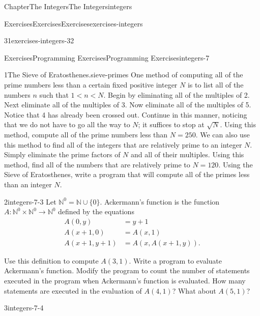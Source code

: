 \documentclass[oneside,10pt,]{book}
\numberwithin{equation}{section}
\newcommand{\lt}{<}
\begin{document}
\begin{chapterptx}{Chapter}{The Integers}{}{The Integers}{}{}{integers}
\begin{exercises-section}{Exercises}{Exercises}{}{Exercises}{}{}{exercises-integers}
\begin{divisionexercise}{31}{}{}{exercises-integers-32}
\end{divisionexercise}%
\end{exercises-section}
%
%
\typeout{************************************************}
\typeout{************************************************}
%
\begin{exercises-section}{Exercises}{Programming Exercises}{}{Programming Exercises}{}{}{integers-7}
\begin{divisionexercise}{1}{The Sieve of Eratosthenes.}{}{sieve-primes}%
%
One method of computing all of the prime numbers less than a certain fixed positive integer \(N\) is to list all of the numbers \(n\) such that \(1 \lt n \lt N\).  Begin by eliminating all of the multiples of 2.  Next eliminate all of the multiples of 3. Now eliminate all of the  multiples of 5.  Notice that 4 has already been crossed out.  Continue in this manner, noticing that we do not have to go all the way to \(N\); it suffices to stop at \(\sqrt{N}\). Using this method, compute all of the prime numbers less than \(N = 250\).  We can also use this method to find all of the integers that are relatively prime to an integer \(N\).  Simply eliminate the prime factors of \(N\) and all of their multiples.  Using this method, find all of the numbers that are relatively prime to \(N= 120\).  Using the Sieve of Eratosthenes, write a program that will compute all of the primes less than an integer \(N\).%
\end{divisionexercise}%
\begin{divisionexercise}{2}{}{}{integers-7-3}%
%
Let \({\mathbb N}^0 = {\mathbb N} \cup \{ 0 \}\). Ackermann's function is the function \(A :{\mathbb N}^0 \times {\mathbb N}^0 \rightarrow {\mathbb N}^0\) defined by the equations%
\begin{align*}
A(0, y) & = y + 1\\
A(x + 1, 0) & = A(x, 1)\\
A(x + 1, y + 1) & = A(x, A(x + 1, y))\text{.}
\end{align*}
%
\par
Use this definition to compute \(A(3, 1)\).  Write a program to evaluate Ackermann's function.  Modify the  program to count the number of statements executed in the program when Ackermann's function is evaluated.  How many statements are executed in the evaluation of \(A(4, 1)\)?  What about \(A(5, 1)\)?%
\end{divisionexercise}%
\begin{divisionexercise}{3}{}{}{integers-7-4}%

\end{divisionexercise}
\end{exercises-section}
\end{chapterptx}
\end{document}
